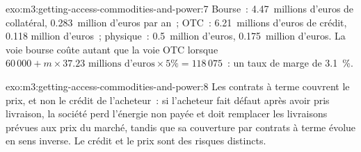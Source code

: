 \begin{solution}{exo:m3:getting-access-commodities-and-power:7}
Bourse~: 4.47~millions d'euros de collatéral, 0.283~million d'euros par an~; OTC~: 6.21~millions d'euros de crédit, 0.118
million d'euros~; physique~: 0.5~million d'euros, 0.175~million d'euros. La voie bourse coûte autant que la voie OTC lorsque
$60\,000 + m \times 37.23\text{ millions d'euros} \times 5\% = 118\,075$~: un taux de marge de 3.1~\%.
\end{solution}

\begin{solution}{exo:m3:getting-access-commodities-and-power:8}
Les contrats à terme couvrent le prix, et non le crédit de l'acheteur~: si l'acheteur fait défaut après avoir pris livraison, la société perd l'énergie non payée
et doit remplacer les livraisons prévues aux prix du marché, tandis que sa couverture par contrats à terme évolue
en sens inverse. Le crédit et le prix sont des risques distincts.
\end{solution}

